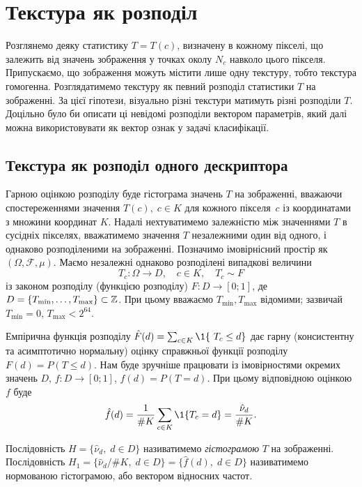 
\section{Текстура як розподіл}\label{section1.2}

Розглянемо деяку статистику $T = T(c)$, визначену в кожному пікселі, що залежить від значень зображення у точках околу $N_c$ навколо цього пікселя.
Припускаємо, що зображення можуть містити лише одну текстуру, тобто текстура гомогенна.
Розглядатимемо текстуру як певний розподіл статистики $T$ на зображенні. 
За цієї гіпотези, візуально різні текстури матимуть різні розподіли $T$.
Доцільно було би описати ці невідомі розподіли вектором параметрів, який далі можна використовувати як вектор ознак у задачі класифікації.

\subsection{Текстура як розподіл одного дескриптора}\label{section1.2a}\hfill

Гарною оцінкою розподілу буде гістограма значень $T$ на зображенні, вважаючи спостереженнями значення $T(c), \; c \in K$ для кожного пікселя~$c$ із координатами з множини координат $K$.
Надалі нехтуватимемо залежністю між значеннями $T$ в сусідніх пікселях, вважатимемо значення $T$ незалежними один від одного, і однаково розподіленими на зображенні.
Позначимо імовірнісний простір як $(\Omega, \mathcal F, \mu)$.
Маємо незалежні однаково розподілені випадкові величини 
\[ T_c \colon \Omega \to D, \quad c \in K, \quad T_c \sim F \] 
із законом розподілу (функцією розподілу) $F \colon D \to [0;1]$, де $D = \{T_{\min},\dots,T_{\max}\} \subset \mathbb Z$.
При цьому вважаємо $T_{\min}, T_{\max}$ відомими; зазвичай $T_{\min} = 0$, $T_{\max} < 2^{64}$.

Емпірична функція розподілу $\hat F(d) = \sum_{c\in K} \1\{\ T_c \le d \}$
дає гарну (консистентну та асимптотично нормальну) оцінку справжньої функції розподілу $F(d) = P(T \le d)$.
Нам буде зручніше працювати із імовірностями окремих значень $D$, $f \colon D \to [0;1]$, $f(d) = P(T = d)$.
При цьому відповідною оцінкою $f$ буде 
\[\hat f(d) = \frac{1}{\# K}\sum_{c\in K}\1\{T_c = d\} = \frac{\hat\nu_d}{\# K}.\]

Послідовність $H = \{ \hat \nu_d, \; d\in D \}$ називатимемо \textit{гістограмою} $T$ на зображенні.
Послідовність $H_1 = \{ \hat \nu_d / \# K, \; d\in D \} = \{\hat f(d), \; d\in D\}$ називатимемо нормованою гістограмою, або вектором відносних частот.

